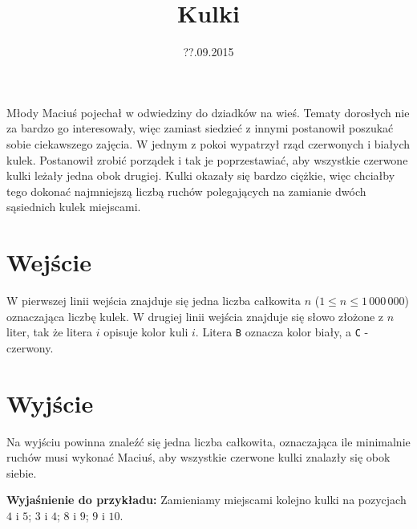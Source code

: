 \documentclass[zad,zawodnik,utf8]{sinol}
\title{Kulki}
\author{} %
\date{??.09.2015}
\begin{document}
\begin{tasktext}%
Młody Maciuś pojechał w odwiedziny do dziadków na wieś. Tematy dorosłych nie za bardzo go interesowały, więc zamiast siedzieć z innymi postanowił poszukać sobie ciekawszego zajęcia. W jednym z pokoi wypatrzył rząd czerwonych i białych kulek. Postanowił zrobić porządek i tak je poprzestawiać, aby wszystkie czerwone kulki leżały jedna obok drugiej. Kulki okazały się bardzo ciężkie, więc chciałby tego dokonać najmniejszą liczbą ruchów polegających na zamianie dwóch sąsiednich kulek miejscami.

  \section{Wejście}
W pierwszej linii wejścia znajduje się jedna liczba całkowita $n$ ($1 \leq n \leq 1\,000\,000$) oznaczająca liczbę kulek.
W drugiej linii wejścia znajduje się słowo złożone z $n$ liter, tak że litera $i$ opisuje kolor kuli $i$. Litera \texttt{B} oznacza kolor biały, a \texttt{C} - czerwony. 

  \section{Wyjście}
Na wyjściu powinna znaleźć się jedna liczba całkowita, oznaczająca ile minimalnie ruchów musi wykonać Maciuś, aby wszystkie czerwone kulki znalazły się obok siebie.

\makecompactexample
  \medskip
  \noindent
  \textbf{Wyjaśnienie do przykładu:} 
  Zamieniamy miejscami kolejno kulki na pozycjach $4$ i $5$; $3$ i $4$; $8$ i $9$; $9$ i $10$.

\end{tasktext}
\end{document}
